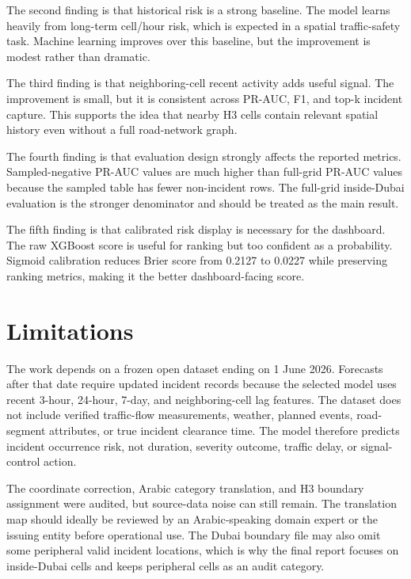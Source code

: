 The second finding is that historical risk is a strong baseline. The model learns heavily from long-term cell/hour risk, which is expected in a spatial traffic-safety task. Machine learning improves over this baseline, but the improvement is modest rather than dramatic.

The third finding is that neighboring-cell recent activity adds useful signal. The improvement is small, but it is consistent across PR-AUC, F1, and top-k incident capture. This supports the idea that nearby H3 cells contain relevant spatial history even without a full road-network graph.

The fourth finding is that evaluation design strongly affects the reported metrics. Sampled-negative PR-AUC values are much higher than full-grid PR-AUC values because the sampled table has fewer non-incident rows. The full-grid inside-Dubai evaluation is the stronger denominator and should be treated as the main result.

The fifth finding is that calibrated risk display is necessary for the dashboard. The raw XGBoost score is useful for ranking but too confident as a probability. Sigmoid calibration reduces Brier score from 0.2127 to 0.0227 while preserving ranking metrics, making it the better dashboard-facing score.

\section{Limitations}

The work depends on a frozen open dataset ending on 1 June 2026. Forecasts after that date require updated incident records because the selected model uses recent 3-hour, 24-hour, 7-day, and neighboring-cell lag features. The dataset does not include verified traffic-flow measurements, weather, planned events, road-segment attributes, or true incident clearance time. The model therefore predicts incident occurrence risk, not duration, severity outcome, traffic delay, or signal-control action.

The coordinate correction, Arabic category translation, and H3 boundary assignment were audited, but source-data noise can still remain. The translation map should ideally be reviewed by an Arabic-speaking domain expert or the issuing entity before operational use. The Dubai boundary file may also omit some peripheral valid incident locations, which is why the final report focuses on inside-Dubai cells and keeps peripheral cells as an audit category.

